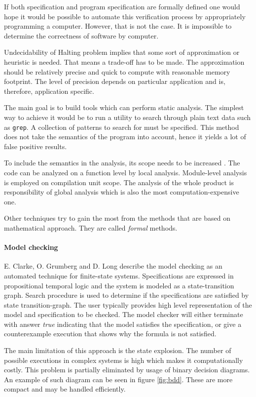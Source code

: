 \documentclass[12pt,final,oneside]{fithesis2}
\begin{document}
If both specification and program specification are formally defined one
would hope it would be possible to automate this verification process by
appropriately programming a computer. However, that is not the case.
It is impossible to determine the correctness of software by computer.

Undecidability of Halting problem implies that some sort of approximation
or heuristic is needed. That means a trade-off has to be made. The
approximation should be relatively precise and quick to compute with
reasonable memory footprint. The level of precision depends on particular
application and is, therefore, application specific.

The main goal is to build tools which can perform static analysis. The
simplest way to achieve it would be to run a utility to search through
plain text data such as \texttt{grep}. A collection of patterns to search
for must be specified. This method does not take the semantics of the
program into account, hence it yields a lot of false positive results.

To include the semantics in the analysis, its scope needs to be increased
\cite{Chess04-1}. The code can be analyzed on a function level by local
analysis. Module-level analysis is employed on compilation unit scope.
The analysis of the whole product is responsibility of global analysis
which is also the most computation-expensive one.

Other techniques try to gain the most from the methods that are based
on mathematical approach. They are called \textit{formal} methods.

\paragraph{Model checking}

E. Clarke, O. Grumberg and D. Long \cite{Clarke99-1} describe the model
checking as an automated technique for finite-state systems. Specifications
are expressed in propositional temporal logic and the system is modeled
as a state-transition graph. Search procedure is used to determine if the
specifications are satisfied by state transition-graph. The user typically
provides high level representation of the model and specification to be
checked. The model checker will either terminate with answer \textit{true}
indicating that the model satisfies the specification, or give
a counterexample execution that shows why the formula is not satisfied.

The main limitation of this approach is the state explosion. The number
of possible executions in complex systems is high which makes it
computationally costly. This problem is partially eliminated by usage
of binary decision diagrams. An example of such diagram can be seen in
figure \ref{fig:bdd}. These are more compact and may be handled
efficiently.
\end{document}
